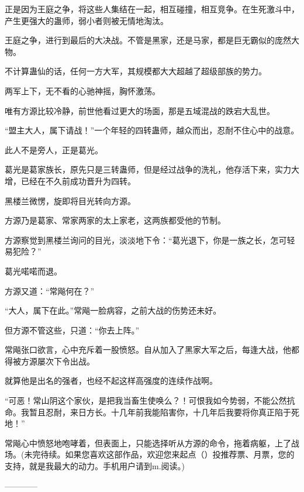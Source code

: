 \begin{this_body}
正是因为王庭之争，将这些人集结在一起，相互碰撞，相互竞争。在生死激斗中，产生更强大的蛊师，弱小者则被无情地淘汰。

王庭之争，进行到最后的大决战。不管是黑家，还是马家，都是巨无霸似的庞然大物。

不计算蛊仙的话，任何一方大军，其规模都大大超越了超级部族的势力。

两军上下，无不看的心驰神摇，胸怀激荡。

唯有方源比较冷静，前世他看过更大的场面，那是五域混战的跌宕大乱世。

“盟主大人，属下请战！”一个年轻的四转蛊师，越众而出，忍耐不住心中的战意。

此人不是旁人，正是葛光。

葛光是葛家族长，原先只是三转蛊师，但是经过战争的洗礼，他存活下来，实力大增，已经在不久前成功晋升为四转。

黑楼兰微愣，旋即将目光转向方源。

方源乃是葛家、常家两家的太上家老，这两族都受他的节制。

方源察觉到黑楼兰询问的目光，淡淡地下令：“葛光退下，你是一族之长，怎可轻易犯险？”

葛光喏喏而退。

方源又道：“常飚何在？”

“大人，属下在此。”常飚一脸病容，之前大战的伤势还未好。

但方源不管这些，只道：“你去上阵。”

常飚张口欲言，心中充斥着一股愤怒。自从加入了黑家大军之后，每逢大战，他都得被方源屡次下令出战。

就算他是出名的强者，也经不起这样高强度的连续作战啊。

“可恶！常山阴这个家伙，是把我当畜生使唤么？！可恨我如今势弱，不能公然抗命。我暂且忍耐，来日方长。十几年前我能陷害你，十几年后我要将你真正陷于死地！”

常飚心中愤怒地咆哮着，但表面上，只能选择听从方源的命令，拖着病躯，上了战场。(未完待续。如果您喜欢这部作品，欢迎您来起点（）投推荐票、月票，您的支持，就是我最大的动力。手机用户请到m.阅读。)

------------

\end{this_body}

